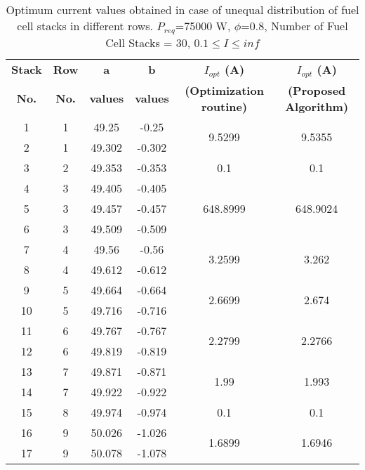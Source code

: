 \documentclass[twocolumn]{autart}
\begin{document}
\begin{table*}[t]
  \centering
   \caption{Optimum current values obtained in case of unequal distribution of fuel cell stacks in different rows. $P_{req}$=75000 W,   	$\phi$=0.8, Number of Fuel Cell Stacks = 30, $0.1\leq I \leq inf$}
      \begin{tabular}{cccccc}
      \toprule
      \textbf{Stack} & \textbf{Row}   &  \textbf{a }   & \textbf{ b}   & \textbf{$I_{opt}$ (A)} & \textbf{$I_{opt}$ (A)} \\
\textbf{No.} &   \textbf{No.}    & \textbf{values} & \textbf{values} & \textbf{{\scriptsize (Optimization routine)}}      &\textbf{{\scriptsize (Proposed Algorithm)}}  \\
     \midrule
    1     & 1     & 49.25 & -0.25 & \multirow{2}[4]{*}{9.5299} & \multirow{2}[4]{*}{9.5355} \\ 
    2     & 1     & 49.302 & -0.302 &       &  \\\midrule
    3     & 2     & 49.353 & -0.353 & 0.1   & 0.1 \\ \midrule
    4     & 3     & 49.405 & -0.405 & \multirow{3}[6]{*}{648.8999} & \multirow{3}[6]{*}{648.9024} \\
    5     & 3     & 49.457 & -0.457 &       &  \\
    6     & 3     & 49.509 & -0.509 &       &  \\ \midrule
    7     & 4     & 49.56 & -0.56 & \multirow{2}[4]{*}{3.2599} & \multirow{2}[4]{*}{3.262} \\
    8     & 4     & 49.612 & -0.612 &       &  \\ \midrule
    9     & 5     & 49.664 & -0.664 & \multirow{2}[4]{*}{2.6699} & \multirow{2}[4]{*}{2.674} \\
    10    & 5     & 49.716 & -0.716 &       &  \\ \midrule
    11    & 6     & 49.767 & -0.767 & \multirow{2}[4]{*}{2.2799} & \multirow{2}[4]{*}{2.2766} \\
    12    & 6     & 49.819 & -0.819 &       &  \\ \midrule
    13    & 7     & 49.871 & -0.871 & \multirow{2}[4]{*}{1.99} & \multirow{2}[4]{*}{1.993} \\
    14    & 7     & 49.922 & -0.922 &       &  \\ \midrule
    15    & 8     & 49.974 & -0.974 & 0.1   & 0.1 \\ \midrule
    16    & 9     & 50.026 & -1.026 & \multirow{2}[4]{*}{1.6899} & \multirow{2}[4]{*}{1.6946} \\
    17    & 9     & 50.078 & -1.078 &       &  \\ \midrule

\end{tabular}
\end{table*}
\end{document}

